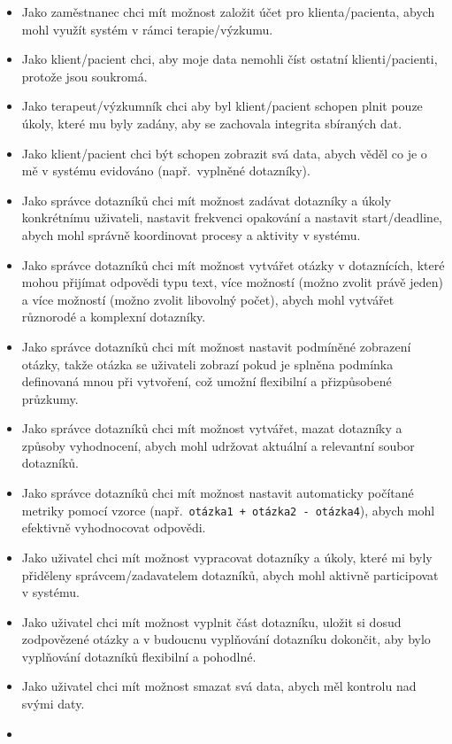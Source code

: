 \begin{itemize}
  \item
  Jako zaměstnanec chci mít možnost založit účet pro klienta/pacienta, abych mohl využít systém v rámci terapie/výzkumu.
  \item
  Jako klient/pacient chci, aby moje data nemohli číst ostatní klienti/pacienti, protože jsou soukromá.
  \item
  Jako terapeut/výzkumník chci aby byl klient/pacient schopen plnit pouze úkoly, které mu byly zadány, aby se zachovala integrita sbíraných dat.
  \item
  Jako klient/pacient chci být schopen zobrazit svá data, abych věděl co je o mě v systému evidováno (např.\ vyplněné dotazníky).
  \item
  Jako správce dotazníků chci mít možnost zadávat dotazníky a úkoly konkrétnímu uživateli, nastavit frekvenci opakování a nastavit start/deadline, abych mohl správně koordinovat procesy a aktivity v systému.
  \item
  Jako správce dotazníků chci mít možnost vytvářet otázky v dotaznících, které mohou přijímat odpovědi typu text, více možností (možno zvolit právě jeden) a více možností (možno zvolit libovolný počet), abych mohl vytvářet různorodé a komplexní dotazníky.
  \item
  Jako správce dotazníků chci mít možnost nastavit podmíněné zobrazení otázky, takže otázka se uživateli zobrazí pokud je splněna podmínka definovaná mnou při vytvoření, což umožní flexibilní a přizpůsobené průzkumy.
  \item
  Jako správce dotazníků chci mít možnost vytvářet, mazat dotazníky a způsoby vyhodnocení, abych mohl udržovat aktuální a relevantní soubor dotazníků.
  \item
  Jako správce dotazníků chci mít možnost nastavit automaticky počítané metriky pomocí vzorce (např.\ \texttt{otázka1 + otázka2 - otázka4}), abych mohl efektivně vyhodnocovat odpovědi.
  \item
  Jako uživatel chci mít možnost vypracovat dotazníky a úkoly, které mi byly přiděleny správcem/zadavatelem dotazníků, abych mohl aktivně participovat v systému.
  \item
  Jako uživatel chci mít možnost vyplnit část dotazníku, uložit si dosud zodpovězené otázky a v budoucnu vyplňování dotazníku dokončit, aby bylo vyplňování dotazníků flexibilní a pohodlné.
  \item
  Jako uživatel chci mít možnost smazat svá data, abych měl kontrolu nad svými daty.
  \item

\end{itemize}

